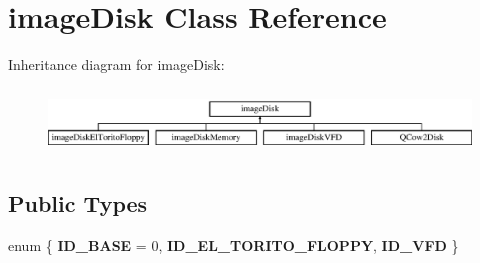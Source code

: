 \hypertarget{classimageDisk}{\section{image\-Disk Class Reference}
\label{classimageDisk}
}
Inheritance diagram for image\-Disk\-:\begin{figure}[H]
\begin{center}
\leavevmode
\includegraphics[height=1.761006cm]{classimageDisk}
\end{center}
\end{figure}
\subsection*{Public Types}
\begin{DoxyCompactItemize}
\item 
enum \{ {\bfseries I\-D\-\_\-\-B\-A\-S\-E} = 0, 
{\bfseries I\-D\-\_\-\-E\-L\-\_\-\-T\-O\-R\-I\-T\-O\-\_\-\-F\-L\-O\-P\-P\-Y}, 
{\bfseries I\-D\-\_\-\-V\-F\-D}
 \}
\end{DoxyCompactItemize}
